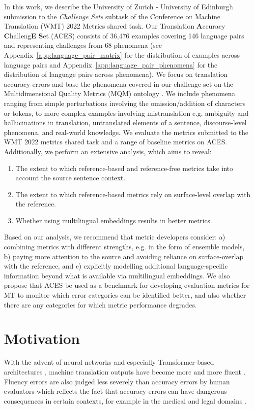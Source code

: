 \documentclass[11pt]{article}
\begin{document}
In this work, we describe the University of Zurich - University of Edinburgh submission to the \textit{Challenge Sets} subtask of the Conference on Machine Translation (WMT) 2022 Metrics shared task. Our Translation \textbf{A}ccuracy \textbf{C}halleng\textbf{E} \textbf{S}et (\textsc{ACES}) consists of 36,476 examples covering 146 language pairs and representing challenges from 68 phenomena (see Appendix~\ref{app:language_pair_matrix} for the distribution of examples across language pairs and Appendix~\ref{app:language_pair_phenomena} for the distribution of language pairs across phenomena). We focus on translation accuracy errors and base the phenomena covered in our challenge set on the Multidimensional Quality Metrics (MQM) ontology \citep{lommel2014}.
We include phenomena ranging from simple perturbations involving the omission/addition of characters or tokens, to more complex examples involving mistranslation e.g. ambiguity and hallucinations in translation, untranslated elements of a sentence, discourse-level phenomena, and real-world knowledge. 
We evaluate the metrics submitted to the WMT 2022 metrics shared task and a range of baseline metrics on \textsc{ACES}. Additionally, we perform an extensive analysis, which aims to reveal:

\begin{enumerate}
    \item The extent to which reference-based and reference-free metrics take into account the source sentence context.
    \item The extent to which reference-based metrics rely on surface-level overlap with the reference.
    \item Whether using multilingual embeddings results in better metrics.
\end{enumerate}

Based on our analysis, we recommend that metric developers consider: a) combining metrics with different strengths, e.g. in the form of ensemble models, b) paying more attention to the source and avoiding reliance on surface-overlap with the reference, and c) explicitly modelling additional language-specific information beyond what is available via multilingual embeddings. We also propose that \textsc{ACES} be used as a benchmark for developing evaluation metrics for MT to monitor which error categories can be identified better, and also whether there are any categories for which metric performance degrades. 

\section{Motivation}
With the advent of neural networks and especially Transformer-based architectures \citep{NIPS2017_7181}, machine translation outputs have become more and more fluent \citep{bentivogli-etal-2016-neural,toral-sanchez-cartagena-2017-multifaceted,article}. Fluency errors are also judged less severely than accuracy errors by human evaluators \citep{freitag-etal-2021-experts} which reflects the fact that accuracy errors can have dangerous consequences in certain contexts, for example in the medical and legal domains \citep{doi:10.1080/1369118X.2020.1776370}.
\end{document}
